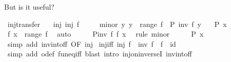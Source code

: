 \begin{isabellebody}
\begin{isamarkuptext}
But is it useful?%
\end{isamarkuptext}\isamarkuptrue%
\isamarkupfalse%
\ inj{\isacharunderscore}{\kern0pt}transfer{\isacharcolon}{\kern0pt}\isanewline
\ \ \ inj{\isacharcolon}{\kern0pt}\ {\isachardoublequoteopen}inj\ f{\isachardoublequoteclose}\isanewline
\ \ \ \ \ minor{\isacharcolon}{\kern0pt}\ {\isachardoublequoteopen}{\isasymAnd}y{\isachardot}{\kern0pt}\ y\ {\isasymin}\ range\ f\ {\isasymLongrightarrow}\ P\ {\isacharparenleft}{\kern0pt}inv\ f\ y{\isacharparenright}{\kern0pt}{\isachardoublequoteclose}\isanewline
\ \ \ {\isachardoublequoteopen}P\ x{\isachardoublequoteclose}\isanewline
%
\isadelimproof
%
\endisadelimproof
%
\isatagproof
{}\isamarkupfalse%
\ {\isacharminus}{\kern0pt}\isanewline
\ \ \isamarkupfalse%
\ {\isachardoublequoteopen}f\ x\ {\isasymin}\ range\ f{\isachardoublequoteclose}\ \isamarkupfalse%
\ auto\isanewline
\ \ \isamarkupfalse%
\ \isamarkupfalse%
\ {\isachardoublequoteopen}P{\isacharparenleft}{\kern0pt}inv\ f\ {\isacharparenleft}{\kern0pt}f\ x{\isacharparenright}{\kern0pt}{\isacharparenright}{\kern0pt}{\isachardoublequoteclose}\ \isamarkupfalse%
\ {\isacharparenleft}{\kern0pt}rule\ minor{\isacharparenright}{\kern0pt}\isanewline
\ \ \isamarkupfalse%
\ \isamarkupfalse%
\ {\isachardoublequoteopen}P\ x{\isachardoublequoteclose}\ \isamarkupfalse%
\ {\isacharparenleft}{\kern0pt}simp\ add{\isacharcolon}{\kern0pt}\ inv{\isacharunderscore}{\kern0pt}into{\isacharunderscore}{\kern0pt}f{\isacharunderscore}{\kern0pt}f\ {\isacharbrackleft}{\kern0pt}OF\ inj{\isacharbrackright}{\kern0pt}{\isacharparenright}{\kern0pt}\isanewline
{}\isamarkupfalse%
%
\endisatagproof
{\isafoldproof}%
%
\isadelimproof
\isanewline
%
\endisadelimproof
\isanewline
{}\isamarkupfalse%
\ inj{\isacharunderscore}{\kern0pt}iff{\isacharcolon}{\kern0pt}\ {\isachardoublequoteopen}inj\ f\ {\isasymlongleftrightarrow}\ inv\ f\ {\isasymcirc}\ f\ {\isacharequal}{\kern0pt}\ id{\isachardoublequoteclose}\isanewline
%
\isadelimproof
\ \ %
\endisadelimproof
%
\isatagproof
{}\isamarkupfalse%
\ {\isacharparenleft}{\kern0pt}simp\ add{\isacharcolon}{\kern0pt}\ o{\isacharunderscore}{\kern0pt}def\ fun{\isacharunderscore}{\kern0pt}eq{\isacharunderscore}{\kern0pt}iff{\isacharparenright}{\kern0pt}\ {\isacharparenleft}{\kern0pt}blast\ intro{\isacharcolon}{\kern0pt}\ inj{\isacharunderscore}{\kern0pt}on{\isacharunderscore}{\kern0pt}inverseI\ inv{\isacharunderscore}{\kern0pt}into{\isacharunderscore}{\kern0pt}f{\isacharunderscore}{\kern0pt}f{\isacharparenright}{\kern0pt}%

\end{isabellebody}
